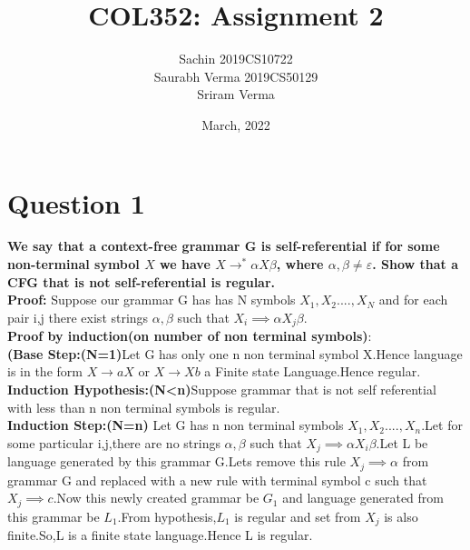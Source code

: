\documentclass{article}
\title{COL352: Assignment 2}
\author{Sachin 2019CS10722 \\
        Saurabh Verma 2019CS50129\\
        Sriram Verma}
\date{March, 2022}
\begin{document}
\maketitle


\section{Question 1}
\textbf{We say that a context-free grammar G is self-referential if for some non-terminal symbol $X$ we have $X \to^* \alpha X \beta$, where $\alpha, \beta \neq \varepsilon$. Show that a CFG that is not self-referential is regular.}
\\
\textbf{Proof:}
Suppose our grammar G has has N symbols
$X_1,X_2....,X_N$ and for each pair i,j there exist strings $\alpha,\beta$ such that $X_i \implies \alpha X_j \beta$.\\
\textbf{Proof by induction(on number of non terminal symbols)}:\\
\textbf{(Base Step:(N=1)}Let G has only one n non terminal symbol X.Hence language is in the form $X \rightarrow aX $ or $X \rightarrow Xb $  a Finite state Language.Hence regular.\\
\textbf{Induction Hypothesis:(N<n)}Suppose grammar that is not self referential with less than n non terminal symbols is regular.\\
\textbf{Induction Step:(N=n)}
Let  G has n non terminal symbols $X_1,X_2....,X_n$.Let for some particular i,j,there are no strings $\alpha,\beta$ such that $X_j \implies \alpha X_i \beta$.Let L be language generated by this grammar G.Lets remove this rule $X_j \implies \alpha$ from grammar G and replaced with a new rule with terminal symbol c such that $X_j \implies c$.Now this newly created grammar be $G_1$ and language generated from this grammar be $L_1$.From hypothesis,$L_1$ is regular and set from $X_j$ is also finite.So,L is a finite state language.Hence L is regular.



\pagebreak
\end{document}
